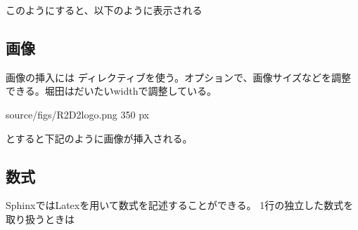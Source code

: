\documentclass[letterpaper,10pt,dvipdfmx,report]{sphinxmanual}
\let\sphinxpxdimen\pdfpxdimen\else\newdimen\sphinxpxdimen
\begin{document}
\begin{sphinxVerbatim}[commandchars=\\\{\}]
  

      

      
      
        
\end{sphinxVerbatim}

このようにすると、以下のように表示される

\begin{sphinxVerbatim}[commandchars=\\\{\}]
  

  
  
    
\end{sphinxVerbatim}


\subsection{画像}
\label{\detokenize{sphinx:id9}}
画像の挿入には  ディレクティブを使う。オプションで、画像サイズなどを調整できる。堀田はだいたいwidthで調整している。

\begin{sphinxVerbatim}[commandchars=\\\{\}]
  source/figs/R2D2\PYGZus{}logo.png
     350 px
\end{sphinxVerbatim}

とすると下記のように画像が挿入される。

\noindent\sphinxincludegraphics[width=350\sphinxpxdimen]{{R2D2_logo}.png}


\subsection{数式}
\label{\detokenize{sphinx:id10}}
SphinxではLatexを用いて数式を記述することができる。
1行の独立した数式を取り扱うときは
\end{document}
